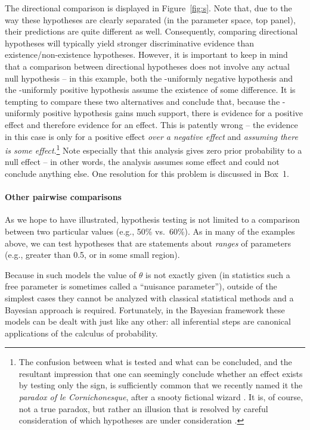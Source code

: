 The directional comparison is displayed in Figure~\ref{fig:s}.  Note that, due to the way these hypotheses are clearly separated (in the parameter space, top panel), their predictions are quite different as well. Consequently, comparing directional hypotheses will typically yield stronger discriminative evidence than existence/non-existence hypotheses. However, it is important to keep in mind that a comparison between directional hypotheses does not involve any actual null hypothesis -- in this example, both the \hyp{uniformly negative hypothesis} and the \hyp{uniformly positive hypothesis} assume the existence of some difference.  It is tempting to compare these two alternatives and conclude that, because the \hyp{uniformly positive hypothesis} gains much support, there is evidence for a positive effect and therefore evidence for an effect.  This is patently wrong -- the evidence in this case is only for a positive effect \emph{over a negative effect} and \emph{assuming there is some effect}.\footnote{The confusion between what is tested and what can be concluded, and the resultant impression that one can seemingly conclude whether an effect exists by testing only the sign, is sufficiently common that we recently named it the \emph{paradox of le Cornichonesque}, after a snooty fictional wizard \cite{EtzSI}. It is, of course, not a true paradox, but rather an illusion that is resolved by careful consideration of which hypotheses are under consideration \cite{RouderSI}.} Note especially that this analysis gives zero prior probability to a null effect -- in other words, the analysis assumes some effect and could not conclude anything else. One resolution for this problem is discussed in Box~1.

\paragraph{Other pairwise comparisons} As we hope to have illustrated, hypothesis testing is not limited to a comparison between two particular values (e.g., 50\% vs.\ 60\%).  As in many of the examples above, we can test hypotheses that are statements about \emph{ranges} of parameters (e.g., greater than 0.5, or in some small region).

Because in such models the value of $\theta$ is not exactly given (in statistics such a free parameter is sometimes called a ``nuisance parameter''), outside of the simplest cases they cannot be analyzed with classical statistical methods and a Bayesian approach is required.  Fortunately, in the Bayesian framework these models can be dealt with just like any other: all inferential steps are canonical applications of the calculus of probability.

